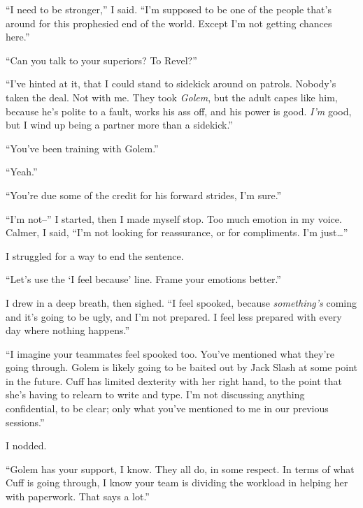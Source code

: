``I need to be stronger,'' I said.  ``I'm supposed to be one of the people that's around for this prophesied end of the world.  Except I'm not getting chances here.''



``Can you talk to your superiors?  To Revel?''



``I've hinted at it, that I could stand to sidekick around on patrols.  Nobody's taken the deal.  Not with me.  They took \emph{Golem}, but the adult capes like him, because he's polite to a fault, works his ass off, and his power is good.  \emph{I'm} good, but I wind up being a partner more than a sidekick.''



``You've been training with Golem.''



``Yeah.''



``You're due some of the credit for his forward strides, I'm sure.''



``I'm not--'' I started, then I made myself stop.  Too much emotion in my voice.  Calmer, I said, ``I'm not looking for reassurance, or for compliments.  I'm just\ldots''



I struggled for a way to end the sentence.



``Let's use the `I feel because' line.  Frame your emotions better.''



I drew in a deep breath, then sighed.  ``I feel spooked, because \emph{something's} coming and it's going to be ugly, and I'm not prepared.  I feel less prepared with every day where nothing happens.''



``I imagine your teammates feel spooked too.  You've mentioned what they're going through.  Golem is likely going to be baited out by Jack Slash at some point in the future.  Cuff has limited dexterity with her right hand, to the point that she's having to relearn to write and type.  I'm not discussing anything confidential, to be clear; only what you've mentioned to me in our previous sessions.''



I nodded.



``Golem has your support, I know.  They all do, in some respect.  In terms of what Cuff is going through, I know your team is dividing the workload in helping her with paperwork.  That says a lot.''



